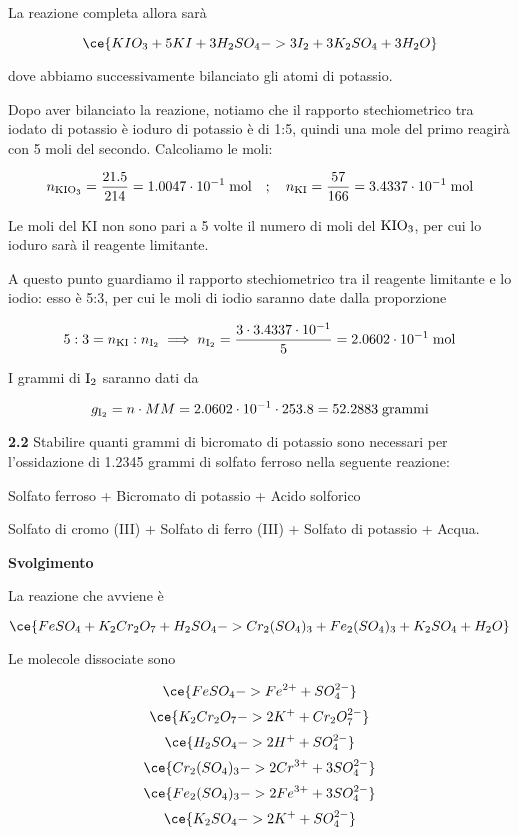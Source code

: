 La reazione completa allora sarà

$$\ce{KIO_3 + 5KI + 3H_2SO_4 -> 3I_2 + 3K_2SO_4 + 3H_2O}$$

dove abbiamo successivamente bilanciato gli atomi di potassio.

Dopo aver bilanciato la reazione, notiamo che il rapporto stechiometrico tra iodato di potassio è ioduro di potassio è di 1:5, quindi una mole del primo reagirà con 5 moli del secondo. Calcoliamo le moli:

$$n_{\rm KIO_3}=\frac{21.5}{214}=1.0047 \cdot 10^{-1} \; \text{mol}
\quad;\quad
n_{\rm KI}=\frac{57}{166}=3.4337 \cdot 10^{-1} \; \rm mol$$

Le moli del KI non sono pari a 5 volte il numero di moli del $\rm KIO_3$, per cui lo ioduro sarà il reagente limitante.

A questo punto guardiamo il rapporto stechiometrico tra il reagente limitante e lo iodio: esso è 5:3, per cui le moli di iodio saranno date dalla proporzione

$$5:3=n_{\rm KI}:n_{\rm I_2}
\implies
n_{\rm I_2}=\frac{3 \cdot 3.4337 \cdot 10^{-1}}{5}
=2.0602 \cdot 10^{-1} \; \rm mol$$

I grammi di $\rm I_2$ saranno dati da

$$g_{\rm I_2}=n \cdot MM
=2.0602 \cdot 10^{-1} \cdot 253.8
=52.2883 \; \rm grammi$$


\vspace{0.2cm}\textbf{2.2} Stabilire quanti grammi di bicromato di potassio sono necessari per l'ossidazione di 1.2345 grammi di solfato ferroso nella seguente reazione:

\begin{center}
    Solfato ferroso + Bicromato di potassio + Acido solforico \ce{->}
    
    \ce{->} Solfato di cromo (III) + Solfato di ferro (III) + Solfato di potassio + Acqua.   
\end{center}

\large\textbf{Svolgimento}\normalsize

\vspace{0.2cm}La reazione che avviene è

$$\ce{FeSO_4 + K_2Cr_2O_7 + H_2SO_4 -> Cr_2(SO_4)_3 + Fe_2(SO_4)_3 + K_2SO_4 + H_2O}$$

Le molecole dissociate sono

$$\ce{FeSO_4 -> Fe^{2+} + SO_4^{2-}}$$
$$\ce{K_2Cr_2O_7 -> 2K^+ + Cr_2O_7^{2-}}$$
$$\ce{H_2SO_4 -> 2H^+ + SO_4^{2-}}$$
$$\ce{Cr_2(SO_4)_3 -> 2Cr^{3+} + 3SO_4^{2-}}$$
$$\ce{Fe_2(SO_4)_3 -> 2Fe^{3+} + 3SO_4^{2-}}$$
$$\ce{K_2SO_4 -> 2K^+ + SO_4^{2-}}$$

